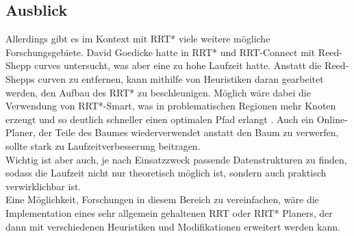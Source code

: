 \subsection{Ausblick}
Allerdings gibt es im Kontext mit RRT* viele weitere mögliche Forschungsgebiete. David Goedicke hatte in \citep{Goedicke18} RRT* und RRT-Connect mit Reed-Shepp curves untersucht, was aber eine zu hohe Laufzeit hatte. Anstatt die Reed-Shepps curven zu entfernen, kann mithilfe von Heuristiken daran gearbeitet werden, den Aufbau des RRT* zu beschleunigen. Möglich wäre dabei die Verwendung von RRT*-Smart, was in problematischen Regionen mehr Knoten erzeugt und so deutlich schneller einen optimalen Pfad erlangt \citep{IsMaNa12}. Auch ein Online-Planer, der Teile des Baumes wiederverwendet anstatt den Baum zu verwerfen, sollte stark zu Laufzeitverbesserung beitragen.\\
Wichtig ist aber auch, je nach Einsatzzweck passende Datenstrukturen zu finden, sodass die Laufzeit nicht nur theoretisch möglich ist, sondern auch praktisch verwirklichbar ist. \\
Eine Möglichkeit, Forschungen in diesem Bereich zu vereinfachen, wäre die Implementation eines sehr allgemein gehaltenen RRT oder RRT* Planers, der dann mit verschiedenen Heuristiken und Modifikationen erweitert werden kann.